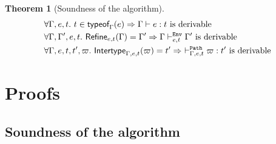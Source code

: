 \documentclass[a4paper]{article}
\theoremstyle{definition}
\newtheorem{theorem}{Theorem}
\newtheorem{lemma}{Lemma}
\begin{document}
%

  \begin{theorem}[Soundness of the algorithm]
    \begin{align*}
      &\forall \Gamma, e, t.\ t\in\textsf{typeof}_{\Gamma}(e) \Rightarrow \Gamma \vdash e:t\text{ is derivable}\\
      &\forall \Gamma, \Gamma', e, t.\ \textsf{Refine}_{e,t}(\Gamma) = \Gamma' \Rightarrow \Gamma \vdash^{\texttt{Env}}_{e,t} \Gamma' \text{ is derivable}\\
      &\forall \Gamma, e, t, t', \varpi.\ \textsf{Intertype}_{\Gamma,e,t} (\varpi) = t' \Rightarrow\ \vdash^{\texttt{Path}}_{\Gamma,e,t} \varpi:t' \text{ is derivable}
    \end{align*}
  \end{theorem}

  \section{Proofs}

  \subsection{Soundness of the algorithm}

  
\end{document}
